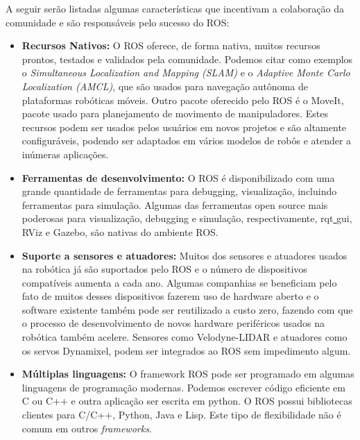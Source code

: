 A seguir serão listadas algumas características que incentivam a colaboração da comunidade e são responsáveis pelo sucesso do ROS\@:

\begin{itemize}
    \item\textbf{Recursos Nativos:} O ROS oferece, de forma nativa, muitos recursos prontos, testados e validados pela comunidade. Podemos citar como exemplos o \textit{Simultaneous Localization and Mapping (SLAM)} e o \textit{Adaptive Monte Carlo Localization (AMCL)}, que são usados para navegação autônoma de plataformas robóticas móveis. Outro pacote oferecido pelo ROS é o MoveIt, pacote usado para planejamento de movimento de manipuladores. Estes recursos podem ser usados pelos usuários em novos projetos e são altamente configuráveis, podendo ser adaptados em vários modelos de robôs e atender a inúmeras aplicações. 

    \item\textbf{Ferramentas de desenvolvimento:} O ROS é disponibilizado com uma grande quantidade de ferramentas para debugging, visualização, incluindo ferramentas para simulação. Algumas das ferramentas open source mais poderosas para visualização, debugging e  simulação, respectivamente, rqt\underline{ }gui, RViz e Gazebo, são nativas do ambiente ROS\@.
    
    \item\textbf{Suporte a sensores e atuadores:} Muitos dos sensores e atuadores usados na robótica já são suportados pelo ROS e o número de dispositivos compatíveis aumenta a cada ano. Algumas companhias se beneficiam pelo fato de muitos desses dispositivos fazerem uso de hardware aberto e o software existente também pode ser reutilizado a custo zero, fazendo com que o processo de desenvolvimento de novos hardware periféricos usados na robótica também acelere. Sensores como Velodyne-LIDAR e atuadores como os servos Dynamixel, podem ser integrados ao ROS sem impedimento algum.
    
    \item\textbf{Múltiplas linguagens:} O framework ROS pode ser programado em algumas linguagens de programação modernas. Podemos escrever código eficiente em C ou C++ e outra aplicação ser escrita em python. O ROS possui bibliotecas clientes para C/C++, Python, Java e Lisp. Este tipo de flexibilidade não é comum em outros \textit{frameworks}.
    
\end{itemize}


